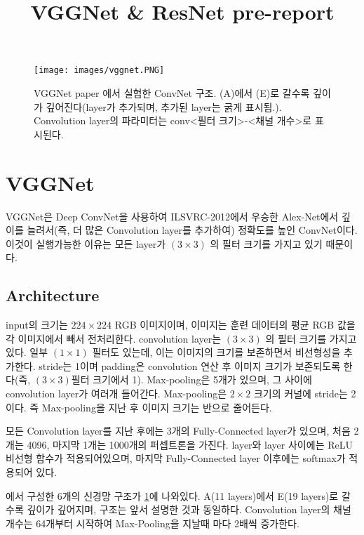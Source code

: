 \documentclass[extendedabs]{bmvc2k}
\begin{document}
\title{VGGNet \& ResNet pre-report}


 
\maketitle
\noindent

\begin{figure}[t]
	\texttt{[image: images/vggnet.PNG]}
	\caption{VGGNet paper\cite{simonyan2015deepconvolutionalnetworkslargescale} 에서 실험한 ConvNet 구조. (A)에서 (E)로 갈수록 깊이가 깊어진다(layer가 추가되며, 추가된 layer는 굵게 표시됨.). Convolution layer의 파라미터는 conv<필터 크기>-<채널 개수>로 표시된다.}
 \label{fig:VGGNet}
	\vspace{-2mm}
\end{figure}
\section{VGGNet}
VGGNet\cite{simonyan2015deepconvolutionalnetworkslargescale}은 Deep ConvNet을 사용하여 ILSVRC-2012에서 우승한 Alex-Net\cite{AlexNet}에서 깊이를 늘려서(즉, 더 많은 Convolution layer를 추가하여) 정확도를 높인 ConvNet이다. 이것이 실행가능한 이유는 모든 layer가 $(3 \times 3)$ 의 필터 크기를 가지고 있기 때문이다.
\subsection{Architecture}
input의 크기는 $224 \times 224$ RGB 이미지이며, 이미지는 훈련 데이터의 평균 RGB 값을 각 이미지에서 빼서 전처리한다. convolution layer는 $(3 \times 3)$ 의 필터 크기를 가지고 있다. 일부 $(1 \times 1)$ 필터도 있는데, 이는 이미지의 크기를 보존하면서 비선형성을 추가한다. stride는 1이며 padding은 convolution 연산 후 이미지 크기가 보존되도록 한다(즉, $(3 \times 3)$필터 크기에서 1). Max-pooling은 5개가 있으며, 그 사이에 convolution layer가 여러개 들어간다. Max-pooling은 $2\times 2$ 크기의 커널에 stride는 2이다. 즉 Max-pooling을 지난 후 이미지 크기는 반으로 줄어든다. 

모든 Convolution layer를 지난 후에는 3개의 Fully-Connected layer가 있으며, 처음 2개는 4096, 마지막 1개는 1000개의 퍼셉트론을 가진다. layer와 layer 사이에는 ReLU\cite{AlexNet} 비선형 함수가 적용되어있으며, 마지막 Fully-Connected layer 이후에는 softmax가 적용되어 있다.

\cite{simonyan2015deepconvolutionalnetworkslargescale}에서 구성한 6개의 신경망 구조가 \ref{fig:VGGNet}에 나와있다. A(11 layers)에서 E(19 layers)로 갈수록 깊이가 깊어지며, 구조는 앞서 설명한 것과 동일하다. Convolution layer의 채널 개수는 64개부터 시작하여 Max-Pooling을 지날때 마다 2배씩 증가한다.
\end{document}
